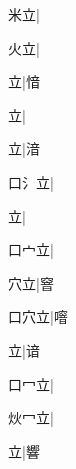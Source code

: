 \begin{multicols}{2}
{{\cjk{}{\cnsym{}　}米立}\mktsJzrVerticalBar{}{\cjk{}{\cnsym{}　}{\cnsym{}　}{\cnsym{}　}}|{}\par
{\cjk{}{\cnsym{}　}火立}\mktsJzrVerticalBar{}{\cjk{}{\cnsym{}　}{\cnsym{}　}{\cnsym{}　}}|{}\par
{立}\mktsJzrVerticalBar{}{\cjk{}{\cnsym{}　}{\cnsym{}　}{\cnsym{}　}}|{\cjk{}愔}\par
{立}\mktsJzrVerticalBar{}{\cjk{}{\cnsym{}　}{\cnsym{}　}{\cnsym{}　}}|{}\par
{立}\mktsJzrVerticalBar{}{\cjk{}{\cnsym{}　}{\cnsym{}　}{\cnsym{}　}}|{\cjk{}湆}\par
{\cjk{}口{\cnxHanaA{}氵}立}\mktsJzrVerticalBar{}{\cjk{}{\cnsym{}　}{\cnsym{}　}{\cnsym{}　}}|{}\par
{立}\mktsJzrVerticalBar{}{\cjk{}{\cnsym{}　}{\cnsym{}　}{\cnsym{}　}}|{}\par
{\cjk{}口{宀}立}\mktsJzrVerticalBar{}{\cjk{}{\cnsym{}　}{\cnsym{}　}{\cnsym{}　}}|{}\par
{\cjk{}{\cnsym{}　}穴立}\mktsJzrVerticalBar{}{\cjk{}{\cnsym{}　}{\cnsym{}　}{\cnsym{}　}}|{\cjk{}窨}\par
{\cjk{}口穴立}\mktsJzrVerticalBar{}{\cjk{}{\cnsym{}　}{\cnsym{}　}{\cnsym{}　}}|{\cjk{}噾}\par
{立}\mktsJzrVerticalBar{}{\cjk{}{\cnsym{}　}{\cnsym{}　}{\cnsym{}　}}|{\cjk{}谙}\par
{\cjk{}口{\cnxHanaA{}冖}立}|{}\par
{\cjk{}炏{\cnxHanaA{}冖}立}\mktsJzrVerticalBar{}{\cjk{}{\cnsym{}　}{\cnsym{}　}{\cnsym{}　}}|{}\par
{立}|{\cjk{}響}\par
}
\end{multicols}
